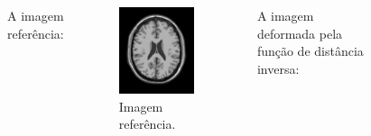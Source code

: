 \documentclass[t]{beamer}
\begin{document}
\begin{frame}
   \begin{columns}[c]
        A imagem referência:
        \begin{figure}[!h]
          \begin{center}
            \includegraphics[width=0.9\textwidth]{../images/screen.png}
            \caption{Imagem referência.}
          \end{center}
        \end{figure}
       A imagem deformada pela função de distância inversa:
        \begin{figure}[!h]
          \begin{center}

\end{center}
\end{figure}
\end{columns}
\end{frame}
\end{document}
